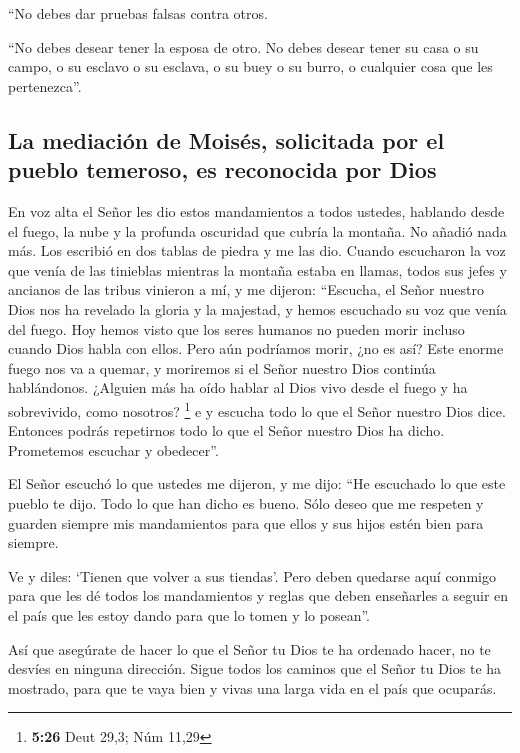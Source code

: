  ``No debes dar pruebas falsas contra otros.

 ``No debes desear tener la esposa de otro. No debes
desear tener su casa o su campo, o su esclavo o su esclava, o su buey o
su burro, o cualquier cosa que les pertenezca''.

\hypertarget{la-mediaciuxf3n-de-moisuxe9s-solicitada-por-el-pueblo-temeroso-es-reconocida-por-dios}{%
\subsection{La mediación de Moisés, solicitada por el pueblo temeroso,
es reconocida por
Dios}\label{la-mediaciuxf3n-de-moisuxe9s-solicitada-por-el-pueblo-temeroso-es-reconocida-por-dios}}

 En voz alta el Señor les dio estos mandamientos a todos
ustedes, hablando desde el fuego, la nube y la profunda oscuridad que
cubría la montaña. No añadió nada más. Los escribió en dos tablas de
piedra y me las dio.  Cuando escucharon la voz que venía
de las tinieblas mientras la montaña estaba en llamas, todos sus jefes y
ancianos de las tribus vinieron a mí,  y me dijeron:
``Escucha, el Señor nuestro Dios nos ha revelado la gloria y la
majestad, y hemos escuchado su voz que venía del fuego. Hoy hemos visto
que los seres humanos no pueden morir incluso cuando Dios habla con
ellos.  Pero aún podríamos morir, ¿no es así? Este enorme
fuego nos va a quemar, y moriremos si el Señor nuestro Dios continúa
hablándonos.  ¿Alguien más ha oído hablar al Dios vivo
desde el fuego y ha sobrevivido, como nosotros? \footnote{\textbf{5:26}
  Deut 29,3; Núm 11,29}  e y escucha todo lo que el Señor
nuestro Dios dice. Entonces podrás repetirnos todo lo que el Señor
nuestro Dios ha dicho. Prometemos escuchar y obedecer''.

 El Señor escuchó lo que ustedes me dijeron, y me dijo:
``He escuchado lo que este pueblo te dijo. Todo lo que han dicho es
bueno.  Sólo deseo que me respeten y guarden siempre mis
mandamientos para que ellos y sus hijos estén bien para siempre.

 Ve y diles: `Tienen que volver a sus tiendas'.
 Pero deben quedarse aquí conmigo para que les dé todos
los mandamientos y reglas que deben enseñarles a seguir en el país que
les estoy dando para que lo tomen y lo posean''.

 Así que asegúrate de hacer lo que el Señor tu Dios te ha
ordenado hacer, no te desvíes en ninguna dirección. 
Sigue todos los caminos que el Señor tu Dios te ha mostrado, para que te
vaya bien y vivas una larga vida en el país que ocuparás.

